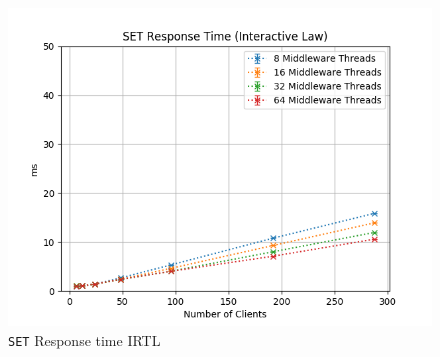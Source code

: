 \documentclass[11pt,a4paper]{article}
\begin{document}
%
\begin{figure}[H]
	\centering
	\captionsetup{width=0.4\textwidth}
    \begin{minipage}{0.5\textwidth}
        \includegraphics[width=\textwidth]{../illustrations/plots/3_1_full_system_write/1-0/middleware_interactive_set_rt_ms.png}
        \caption{\texttt{SET} Response time IRTL}
        \label{fig:full_system_write_set_rt_it}
    \end{minipage}\hfill
\end{figure}
%
\end{document}

